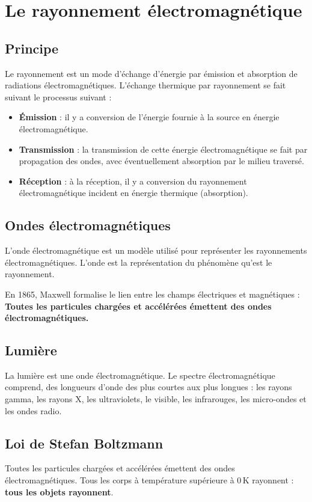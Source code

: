 \section{Le rayonnement électromagnétique}

\subsection*{Principe}
Le rayonnement est un mode d'échange d'énergie par émission et absorption de radiations électromagnétiques. L'échange thermique par rayonnement se fait suivant le processus suivant :
\begin{itemize}
  \item \textbf{Émission} : il y a conversion de l'énergie fournie à la source en énergie électromagnétique.
  \item \textbf{Transmission} : la transmission de cette énergie électromagnétique se fait par propagation des ondes, avec éventuellement absorption par le milieu traversé.
  \item \textbf{Réception} : à la réception, il y a conversion du rayonnement électromagnétique incident en énergie thermique (absorption).
\end{itemize}

\subsection*{Ondes électromagnétiques}
L'onde électromagnétique est un modèle utilisé pour représenter les rayonnements électromagnétiques.
L'onde est la représentation du phénomène qu'est le rayonnement.

En 1865, Maxwell formalise le lien entre les champs électriques et magnétiques : \textbf{Toutes les particules chargées et accélérées émettent des ondes électromagnétiques.}

\subsection*{Lumière}
La lumière est une onde électromagnétique. Le spectre électromagnétique comprend, des longueurs d'onde des plus courtes aux plus longues : les rayons gamma, les rayons X, les ultraviolets, le visible, les infrarouges, les micro-ondes et les ondes radio.

\subsection*{Loi de Stefan Boltzmann}
Toutes les particules chargées et accélérées émettent des ondes électromagnétiques.
Tous les corps à température supérieure à 0\,K rayonnent : \textbf{tous les objets rayonnent}.


